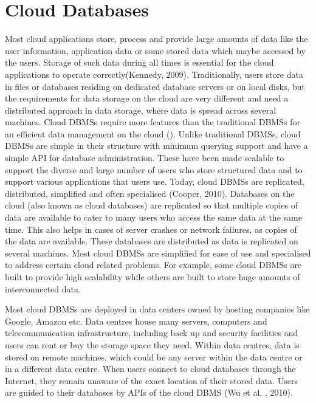 \section{Cloud Databases}\label{s:cloud-databases}

Most cloud applications store,   process and provide large amounts of data like
the user information,   application data or some stored data which maybe accessed
by the users.  Storage of such data during all times is essential for the cloud
applications to operate correctly(Kennedy,   2009). Traditionally,   users store data
in files or databases residing on dedicated database servers or on local disks,  
but the requirements for data storage on the cloud are very different and need a
distributed approach in data storage,   where data is spread across several
machines.  Cloud \acp{DBMS} require more features than the traditional \acp{DBMS}
for an efficient data management on the cloud ().  Unlike
traditional \acp{DBMS},   cloud \acp{DBMS} are simple in their structure with
minimum querying support and have a simple API for database
administration.  These have been made scalable to support the diverse
and large number of users who store structured data and to support various
applications that users use.  Today,   cloud \acp{DBMS} are replicated,   distributed,  
simplified and often specialised (Cooper,   2010).  Databases on the cloud
(also known as cloud databases) are replicated so that multiple copies of data
are available to cater to many users who access the same data at the same time.  This also helps in cases of server crashes or
network failures,   as copies of the data are available.  These databases are
distributed as data is replicated on several machines.  Most cloud \acp{DBMS} are
simplified for ease of use and specialised to address certain cloud related
problems.  For example,   some cloud \acp{DBMS} are built to provide high
scalability while others are built to store huge amounts of interconnected data. 

Most cloud \acp{DBMS} are deployed in data centers owned by hosting companies
like Google,   Amazon etc.  Data centres house many servers,   computers and
telecommunication infrastructure,   including back up and security facilities and
users can rent or buy the storage space they need.  Within data centres,   data
is stored on remote machines,   which could be any server within the data
centre or in a different data centre.  When users connect to cloud databases
through the Internet,   they remain unaware of the exact location of their stored
data.   Users are guided to their databases by \acp{API} of the cloud \ac{DBMS}
(Wu et al. ,   2010). 

